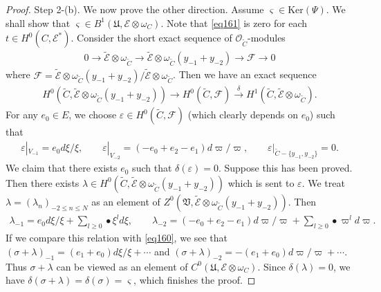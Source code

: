\documentclass[12pt,b5paper,notitlepage]{report}
\theoremstyle{definition}
\theoremstyle{plain}
\newcommand{\fk}{\mathfrak}
\newcommand{\wtd}{\widetilde}
\newcommand{\scr}{\mathscr}
\newcommand{\sgm}{\varsigma}
\newcommand{\blt}{\bullet}
\newcommand{\Ker}{\mathrm{Ker}}
\numberwithin{equation}{section}
\begin{document}
\begin{proof}
Step 2-(b). We now prove the other direction. Assume $\sgm\in\Ker(\Psi)$. We shall show that $\sgm\in B^1(\fk U,\scr E\otimes\omega_C)$. Note that \eqref{eq161} is zero for each $t\in H^0(C,\scr E^*)$. Consider the short exact sequence of $\scr O_{\wtd C}$-modules
\begin{align*}
0\rightarrow\wtd{\scr E}\otimes\omega_{\wtd C}\rightarrow \wtd{\scr E}\otimes\omega_{\wtd C}(y_{-1}+y_{-2})\rightarrow \scr F\rightarrow 0
\end{align*}
where $\scr F=\wtd{\scr E}\otimes\omega_{\wtd C}(y_{-1}+y_{-2})/\wtd{\scr E}\otimes\omega_{\wtd C}$. Then we have an exact sequence
\begin{align*}
H^0(\wtd C,\wtd{\scr E}\otimes\omega_{\wtd C}(y_{-1}+y_{-2}))\rightarrow H^0(\wtd C,\scr F)\xrightarrow{\delta} H^1(\wtd C,\wtd{\scr E}\otimes\omega_{\wtd C}).
\end{align*}
For any $e_0\in E$, we choose $\varepsilon\in H^0(\wtd C,\scr F)$ (which clearly depends on $e_0$) such that
\begin{gather*}
\varepsilon|_{V_{-1}}=e_0d\xi/\xi,\qquad \varepsilon|_{V_{-2}}=(-e_0+e_2-e_1)d\varpi/\varpi ,\qquad  \varepsilon|_{\wtd C-\{y_{-1},y_{-2}\}}=0.
\end{gather*}
We claim that there exists $e_0$ such that $\delta(\varepsilon)=0$. Suppose this has been proved. Then there exists $\lambda\in H^0(\wtd C,\wtd{\scr E}\otimes\omega_{\wtd C}(y_{-1}+y_{-2}))$ which is sent to $\varepsilon$. We treat $\lambda=(\lambda_n)_{-2\leq n\leq N}$ as an element of $Z^0(\fk V,\wtd{\scr E}\otimes\omega_{\wtd C}(y_{-1}+y_{-2}))$. Then
\begin{align*}
\lambda_{-1}=e_0d\xi/\xi+\sum_{l\geq 0}\blt \xi^ld\xi,\qquad \lambda_{-2}=(-e_0+e_2-e_1)d\varpi/\varpi+\sum_{l\geq 0}\blt \varpi^ld\varpi.
\end{align*}
If we compare this relation with \eqref{eq160},  we see that $(\sigma+\lambda)_{-1}=(e_1+e_0)d\xi/\xi+\cdots$ and $(\sigma+\lambda)_{-2}=-(e_1+e_0)d\varpi/\varpi+\cdots$. Thus $\sigma+\lambda$ can be viewed as an element of $C^0(\fk U,\scr E\otimes\omega_C)$. Since $\delta(\lambda)=0$, we have $\delta(\sigma+\lambda)=\delta(\sigma)=\sgm$, which finishes the proof.



\end{proof}
\end{document}

